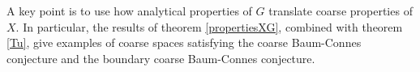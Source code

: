 A key point is to use how analytical properties of $G$ translate coarse properties of $X$. In particular, the results of theorem \ref{propertiesXG}, combined with theorem \ref{Tu}, give examples of coarse spaces satisfying the coarse Baum-Connes conjecture and the boundary coarse Baum-Connes conjecture.

















